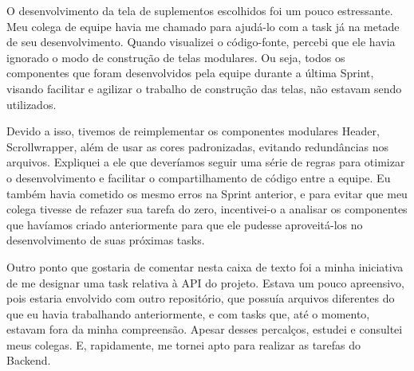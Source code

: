 \begin{reflection}
\indent \originaltab{}O desenvolvimento da tela de suplementos escolhidos foi um pouco estressante. Meu colega de equipe havia me chamado para ajudá-lo com a task já na metade de seu desenvolvimento. Quando visualizei o código-fonte, percebi que ele havia ignorado o modo de construção de telas modulares. Ou seja, todos os componentes que foram desenvolvidos pela equipe durante a última Sprint, visando facilitar e agilizar o trabalho de construção das telas, não estavam sendo utilizados.

\indent \originaltab{}Devido a isso, tivemos de reimplementar os componentes modulares Header, Scrollwrapper, além de usar as cores padronizadas, evitando redundâncias nos arquivos. Expliquei a ele que deveríamos seguir uma série de regras para otimizar o desenvolvimento e facilitar o compartilhamento de código entre a equipe. Eu também havia cometido os mesmo erros na Sprint anterior, e para evitar que meu colega tivesse de refazer sua tarefa do zero, incentivei-o a analisar os componentes que havíamos criado anteriormente para que ele pudesse aproveitá-los no desenvolvimento de suas próximas tasks.

\indent \originaltab{}Outro ponto que gostaria de comentar nesta caixa de texto foi a minha iniciativa de me designar uma task relativa à API do projeto. Estava um pouco apreensivo, pois estaria envolvido com outro repositório, que possuía arquivos diferentes do que eu havia trabalhando anteriormente, e com tasks que, até o momento, estavam fora da minha compreensão. Apesar desses percalços, estudei e consultei meus colegas. E, rapidamente, me tornei apto para realizar as tarefas do Backend.\originalspace{}\originalspace{}

\end{reflection}
